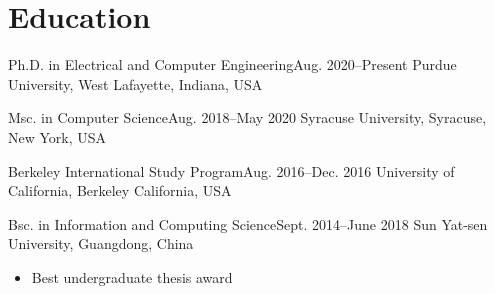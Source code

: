 \documentclass[letterpaper, 11pt]{article}
\begin{document}

\maketitle

\section{Education}

\begin{itemize}

\begin{itemntl}{Ph.D. in Electrical and Computer Engineering}{Aug. 2020--Present}
{Purdue University, West Lafayette, Indiana, USA}
\end{itemntl}

\begin{itemntl}{Msc. in Computer Science}{Aug. 2018--May 2020}
{Syracuse University, Syracuse, New York, USA}
\end{itemntl}

\begin{itemntl}{Berkeley International Study Program}{Aug. 2016--Dec. 2016}
{University of California, Berkeley California, USA}
\end{itemntl}

\begin{itemntl}{Bsc. in Information and Computing Science}{Sept. 2014--June 2018}
{Sun Yat-sen University, Guangdong, China}
\begin{itemize}
\item Best undergraduate thesis award
\end{itemize}
\end{itemntl}

\end{itemize}
\end{document}
